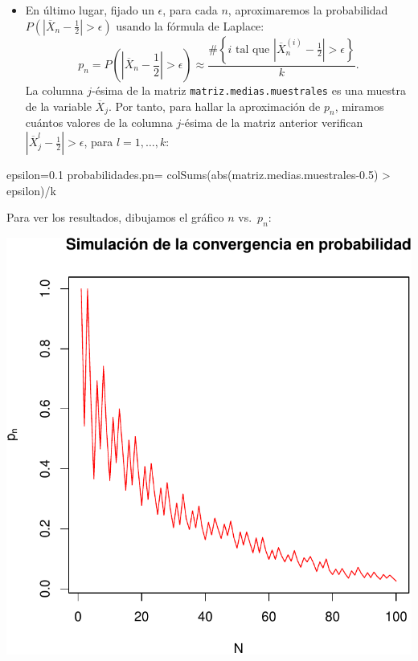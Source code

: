 \documentclass[
  letterpaper,
  DIV=11,
  numbers=noendperiod]{scrreprt}
\newenvironment{Shaded}{\begin{snugshade}}{\end{snugshade}}
\newcommand{\FloatTok}[1]{\textcolor[rgb]{0.68,0.00,0.00}{#1}}
\newcommand{\FunctionTok}[1]{\textcolor[rgb]{0.28,0.35,0.67}{#1}}
\newcommand{\NormalTok}[1]{\textcolor[rgb]{0.00,0.23,0.31}{#1}}
\newcommand{\OtherTok}[1]{\textcolor[rgb]{0.00,0.23,0.31}{#1}}
\newcommand{\SpecialCharTok}[1]{\textcolor[rgb]{0.37,0.37,0.37}{#1}}
\providecommand{\tightlist}{%
  \setlength{\itemsep}{0pt}\setlength{\parskip}{0pt}}\usepackage{longtable,booktabs,array}
\begin{document}
\begin{itemize}
\tightlist
\item
  En último lugar, fijado un \(\epsilon\), para cada \(n\),
  aproximaremos la probabilidad
  \(P\left(\left|\overline{X}_n-\frac{1}{2}\right|>\epsilon\right)\)
  usando la fórmula de Laplace: \[
  p_n=P\left(\left|\overline{X}_n-\frac{1}{2}\right|>\epsilon\right) \approx\frac{\#\left\{\mbox{$i$ tal que  $\left|\overline{X}_n^{(i)}-\frac{1}{2}\right|>\epsilon$}\right\}}{k}.
  \] La columna \(j\)-ésima de la matriz
  \texttt{matriz.medias.muestrales} es una muestra de la variable
  \(\overline{X}_j\). Por tanto, para hallar la aproximación de \(p_n\),
  miramos cuántos valores de la columna \(j\)-ésima de la matriz
  anterior verifican
  \(\left|\overline{X}_j^{l}-\frac{1}{2}\right|>\epsilon\), para
  \(l=1,\ldots, k\):
\end{itemize}

\begin{Shaded}
\begin{Highlighting}[]
\NormalTok{epsilon}\OtherTok{=}\FloatTok{0.1}
\NormalTok{probabilidades.pn}\OtherTok{=} \FunctionTok{colSums}\NormalTok{(}\FunctionTok{abs}\NormalTok{(matriz.medias.muestrales}\FloatTok{{-}0.5}\NormalTok{) }\SpecialCharTok{\textgreater{}}\NormalTok{ epsilon)}\SpecialCharTok{/}\NormalTok{k}
\end{Highlighting}
\end{Shaded}

Para ver los resultados, dibujamos el gráfico \(n\) vs.~\(p_n\):

\includegraphics{7_files/figure-pdf/unnamed-chunk-6-1.pdf}
\end{document}
